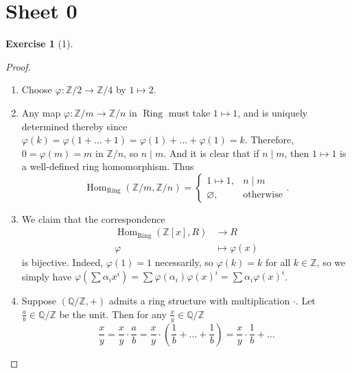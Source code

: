 \documentclass[reqno]{amsart}
\theoremstyle{definition}
\newtheorem{exercise}[theorem]{Exercise}
\theoremstyle{remark}
\DeclareMathOperator{\Hom}{Hom}
\DeclareMathOperator{\Ring}{Ring}
\begin{document}
\section*{Sheet 0}
\begin{exercise}[1]
    \begin{proof}
        \begin{enumerate}
            \item 
        Choose
        $\varphi  \colon \mathbb{Z}/2 \to \mathbb{Z}/4$ by
        $1 \mapsto 2$.
    \item Any map $ \varphi \colon 
        \mathbb{Z} /m \to \mathbb{Z} /n$ in
        $\Ring$ must take $1 \mapsto 1$, and
        is uniquely determined thereby
        since $\varphi (k) =
        \varphi \left( 1 + \ldots+ 1 \right) 
        = \varphi (1) + \ldots + \varphi (1)
        = k$.
        Therefore, $0 = \varphi (m) = 
        m$ in $\mathbb{Z} / n$, so $n  \mid m$.
        And it is clear that if $n  \mid m$, then
        $1 \mapsto 1$ is a well-defined ring
        homomorphism. Thus
        \[
        \Hom_{\Ring}\left( \mathbb{Z}/m,
        \mathbb{Z}/n \right) 
        = 
        \begin{cases}
            1 \mapsto 1,& n  \mid m\\
            \varnothing,& \text{otherwise}
        \end{cases}.
        \] 
    \item We claim that the correspondence
        \begin{align*}
            \Hom_{\Ring}\left( \mathbb{Z}[x], R \right) 
            &\to R\\
            \varphi &\mapsto \varphi (x)
        \end{align*}
        is bijective.
        Indeed, $\varphi (1) = 1$ necessarily,
        so $\varphi (k) = k$ for
        all $k \in \mathbb{Z}$, so we
        simply have
        $\varphi \left( \sum \alpha_i x^{i} \right) 
        = \sum \varphi \left( \alpha_i \right) 
        \varphi (x)^{i} 
        = \sum \alpha_i \varphi (x)^{i}$.
    \item Suppose $\left( \mathbb{Q}/ \mathbb{Z},
        +\right) $ admits a ring structure with
        multiplication $\cdot $. Let
        $\frac{a}{b} \in \mathbb{Q} / \mathbb{Z}$ be
        the unit. Then for any $\frac{x}{y} \in 
        \mathbb{Q} / \mathbb{Z}$
        \[
        \frac{x}{y}
        =\frac{x}{y} \cdot \frac{a}{b}
        = \frac{x}{y}\cdot \left( \frac{1}{b} + \ldots
        + \frac{1}{b}\right) 
        = \frac{x}{y}\cdot \frac{1}{b} + \ldots
\]
\end{enumerate}
\end{proof}
\end{exercise}
\end{document}
